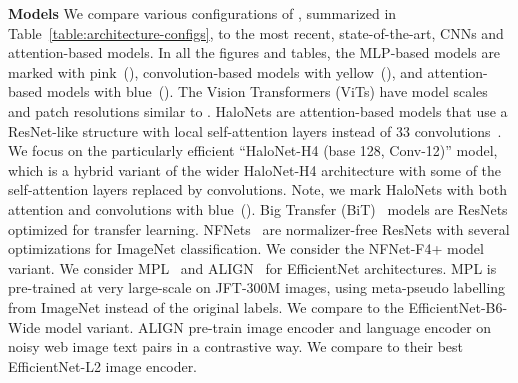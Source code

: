 {\bf Models\;\;}
We compare various configurations of \name{}, summarized in Table~\ref{table:architecture-configs}, to the most recent, state-of-the-art, CNNs and attention-based models.
In all the figures and tables, 
the MLP-based \name{} models are marked with pink~(\MDot{}),
convolution-based models with yellow~(\CDot{}), 
and attention-based models with blue~(\ADot{}).
The Vision Transformers (ViTs) have model scales and patch resolutions similar to \name{}.
HaloNets are attention-based models that use a ResNet-like structure with local self-attention layers instead of 33 convolutions~\citep{vaswani2021scaling}.
We focus on the particularly efficient ``HaloNet-H4 (base 128, Conv-12)'' model, which is a hybrid variant of the wider HaloNet-H4 architecture with some of the self-attention layers replaced by convolutions.
Note, we mark HaloNets with both attention and convolutions with blue~(\ADot{}).
Big Transfer (BiT)~\citep{kolesnikov2020-bit} models are ResNets optimized for transfer learning.
NFNets~\citep{brock2021high} are normalizer-free ResNets with several optimizations for ImageNet classification.
We consider the NFNet-F4+ model variant.
We consider MPL~\citep{pham2020meta} and ALIGN~\citep{jia2021scaling} for EfficientNet architectures. MPL is pre-trained at very large-scale on JFT-300M images, using meta-pseudo labelling from ImageNet instead of the original labels. We compare to the EfficientNet-B6-Wide model variant. ALIGN pre-train image encoder and language encoder on noisy web image text pairs in a contrastive way. We compare to their best EfficientNet-L2 image encoder.

